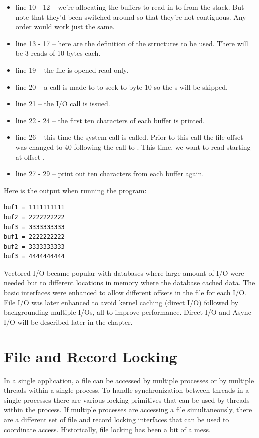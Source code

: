 \begin{itemize}
	\item line 10 - 12 -- we're allocating the buffers to read in to from the stack. But note that they'd been
		switched around so that they're not contiguous. Any order would work just the same.
	\item line 13 - 17 -- here are the definition of the  structures to be used. There will be 3 reads of 10 bytes each.
	\item line 19 -- the file is opened read-only.
	\item line 20 -- a call is made to  to seek to byte 10 so the s will be skipped.
	\item line 21 -- the I/O call is issued.
	\item line 22 - 24 -- the first ten characters of each buffer is printed.
	\item line 26 -- this time the  system call is called. Prior to this call the file offset was changed to 40 following
		the call to . This time, we want to read starting at offset .
	\item line 27 - 29 -- print out ten characters from each buffer again.
\end{itemize}

\noindent
Here is the output when running the program:

\begin{lstlisting}
buf1 = 1111111111
buf2 = 2222222222
buf3 = 3333333333
buf1 = 2222222222
buf2 = 3333333333
buf3 = 4444444444
\end{lstlisting}

\noindent
Vectored I/O became popular with databases where large amount of I/O were needed but to different locations in memory where the database cached data. The basic interfaces were enhanced to allow different offsets in the file for each I/O. File I/O was later enhanced to avoid kernel caching (direct I/O) followed by backgrounding multiple I/Os, all to improve performance. Direct I/O and Async I/O will be described later in the chapter. 


\section{File and Record Locking}\label{prog-locking}

In a single application, a file can be accessed by multiple processes or by multiple threads within a single process. To handle synchronization between threads in a single processes there are various locking primitives that can be used by threads within the process. If multiple processes are accessing a file simultaneously, there are a different set of file and record locking interfaces that can be used to coordinate access. Historically, file locking has been a bit of a mess.

